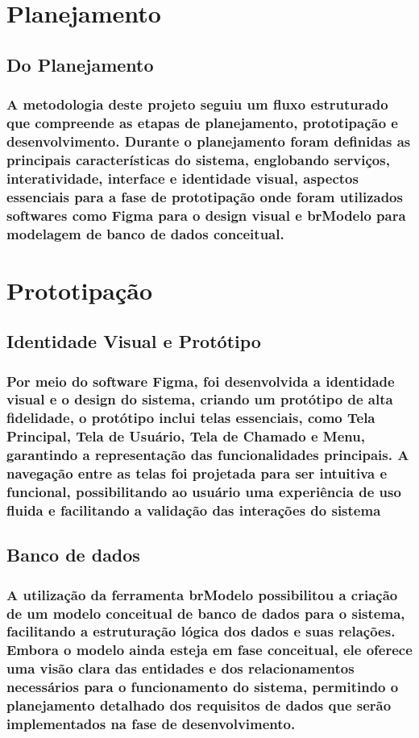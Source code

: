 \section{Planejamento}
\subsection{Do Planejamento}
\subsubsection{A metodologia deste projeto seguiu um fluxo estruturado que compreende as etapas de planejamento, prototipação e desenvolvimento. Durante o planejamento foram definidas as principais características do sistema, englobando serviços, interatividade, interface e identidade visual, aspectos essenciais para a fase de prototipação onde foram utilizados softwares como Figma para o design visual e brModelo para modelagem de banco de dados conceitual.}

\section{Prototipação}
\subsection{Identidade Visual e Protótipo }
\subsubsection{Por meio do software Figma, foi desenvolvida a identidade visual e o design do sistema, criando um protótipo de alta fidelidade, o protótipo inclui telas essenciais, como Tela Principal, Tela de Usuário, Tela de Chamado e Menu, garantindo a representação das funcionalidades principais. A navegação entre as telas foi projetada para ser intuitiva e funcional, possibilitando ao usuário uma experiência de uso fluida e facilitando a validação das interações do sistema}

\subsection{Banco de dados }
\subsubsection{A utilização da ferramenta brModelo possibilitou a criação de um modelo conceitual de banco de dados para o sistema, facilitando a estruturação lógica dos dados e suas relações. Embora o modelo ainda esteja em fase conceitual, ele oferece uma visão clara das entidades e dos relacionamentos necessários para o funcionamento do sistema, permitindo o planejamento detalhado dos requisitos de dados que serão implementados na fase de desenvolvimento.}

